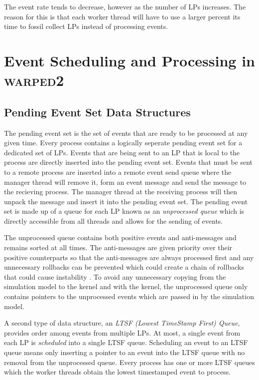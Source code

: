 \documentclass[11pt]{book}
\begin{document}
The event rate tends to decrease, however as the number of LPs increases.  The reason for this is
that each worker thread will have to use a larger percent its time to fossil collect LPs instead of
processing events.



\chapter[Event Scheduling]{Event Scheduling and Processing in \textsc{warped2}}\label{warped2_ds}

\section{Pending Event Set Data Structures}

The pending event set is the set of events that are ready to be processed at any given time.  Every
process contains a logically seperate pending event set for a dedicated set of LPs.  Events that are
being sent to an LP that is local to the process are directly inserted into the pending event set.
Events that must be sent to a remote process are inserted into a remote event send queue where the
manager thread will remove it, form an event message and send the message to the recieving process.
The manager thread at the receiving process will then unpack the message and insert it into the
pending event set.  The pending event set is made up of a queue for each LP known as an
\emph{unprocessed queue} which is directly accessible from all threads and allows for the sending of
events.

The unprocessed queue contains both positive events and anti-messages and remains sorted at all
times.  The anti-messages are given priority over their positive counterparts so that the
anti-messages are always processed first and any unnecessary rollbacks can be prevented which
could create a chain of rollbacks that could cause instability \cite{lubachevsky-89}.  To avoid
any unnecessary copying from the simulation model to the kernel and with the kernel, the
unprocessed queue only contains pointers to the unprocessed events which are passed in by the
simulation model.

A second type of data structure, an \emph{LTSF (Lowest TimeStamp First) Queue}, provides order among
events from multiple LPs.  At most, a single event from each LP is \emph{scheduled} into a single
LTSF queue.  Scheduling an event to an LTSF queue means only inserting a pointer to an event into
the LTSF queue with no removal from the unprocessed queue.  Every process has one or more LTSF
queues which the worker threads obtain the lowest timestamped event to process.
\end{document}
